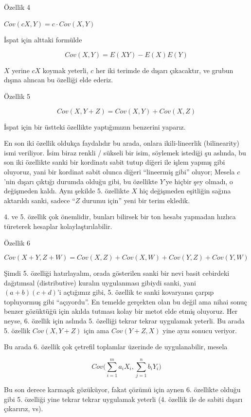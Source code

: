 \documentclass[12pt,fleqn]{article}\usepackage{../../common}
\begin{document}
Özellik 4

$Cov(cX,Y) = c \cdot Cov(X,Y)$ 

İspat için alttaki formülde

$$ Cov(X,Y) =  E(XY) - E(X)E(Y) $$

$X$ yerine $cX$ koymak yeterli, $c$ her iki terimde de dışarı çıkacaktır,
ve grubun dışına alıncan bu özelliği elde ederiz.

Özellik 5

$$ Cov(X,Y+Z) = Cov(X,Y) + Cov(X,Z) $$

İspat için bir üstteki özellikte yaptığımızın benzerini yaparız. 

En son iki özellik oldukça faydalıdır bu arada, onlara ikili-lineerlik
(bilinearity) ismi veriliyor. İsim biraz renkli / sükseli bir isim,
söylemek istediği şu aslında, bu son iki özellikte sanki bir kordinatı
sabit tutup diğeri ile işlem yapmış gibi oluyoruz, yani bir kordinat sabit
olunca diğeri ``lineermiş gibi'' oluyor; Mesela $c$'nin dışarı çıktığı
durumda olduğu gibi, bu özellikte $Y$'ye hiçbir şey olmadı, o değişmeden
kaldı. Aynı şekilde 5. özellikte $X$ hiç değişmeden eşitliğin sağına
aktarıldı sanki, sadece ``$Z$ durumu için'' yeni bir terim ekledik. 

4. ve 5. özellik çok önemlidir, bunları bilirsek bir ton hesabı yapmadan
hızlıca türeterek hesaplar kolaylaştırılabilir.

Özellik 6

$$ Cov(X+Y, Z+W) = Cov(X,Z) + Cov(X,W) + Cov(Y,Z) + Cov(Y,W) $$

Şimdi 5. özelliği hatırlayalım, orada gösterilen sanki bir nevi basit
cebirdeki dağıtımsal (distributive) kuralın uygulanması gibiydi sanki, yani
$(a+b)(c+d)$'i açtığımız gibi, 5. özellik te sanki kovaryansı çarpıp
topluyormuş gibi ``açıyordu''. En temelde gerçekten olan bu değil ama nihai
sonuç benzer gözüktüğü için akılda tutması kolay bir metot elde etmiş
oluyoruz. Her neyse, 6. özellik için aslında 5. özelliği tekrar tekrar
uygulamak yeterli. Bu arada 5. özellik $Cov(X,Y+Z)$ için ama $Cov(Y+Z,X)$
yine aynı sonucu veriyor. 

Bu arada 6. özellik çok çetrefil toplamlar üzerinde de uygulanabilir,
mesela 

$$ Cov \bigg( \sum _{i=1}^{m}a_iX_i, \sum _{j=1}^{n}b_iY_i \bigg) $$

Bu son derece karmaşık gözüküyor, fakat çözümü için aynen 6. özellikte
olduğu gibi 5. özelliği yine tekrar tekrar uygulamak yeterli (4. özellik
ile de sabiti dışarı çıkarırız, vs).
\end{document}
